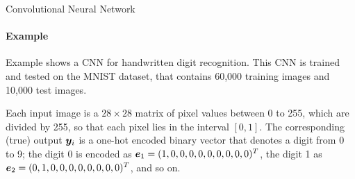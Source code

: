 \begin{frame}{Convolutional Neural Network}
\framesubtitle{Example}

\vspace*{-0.5cm}

Example shows a CNN for handwritten digit
    recognition. This CNN is trained and tested on the MNIST dataset,
    that contains 60,000 training images and 10,000 test images. 

\medskip

    Each input image is a $ 28
    \times 28$ matrix of pixel values between 0 to 255, which are
    divided by 255, so that each pixel lies in the interval $[0,1]$.
    The corresponding (true)
    output ${\boldsymbol y}_i$ is a one-hot encoded binary vector that denotes a
    digit from 0 to 9;  the digit 0 is encoded as
    ${\boldsymbol e}_1 = (1,0,0,0,0,0,0,0,0,0)^T$, the digit 1 as ${\boldsymbol e}_2 =
    (0,1,0,0,0,0,0,0,0,0)^T$,
    and so on. 


\end{frame}
